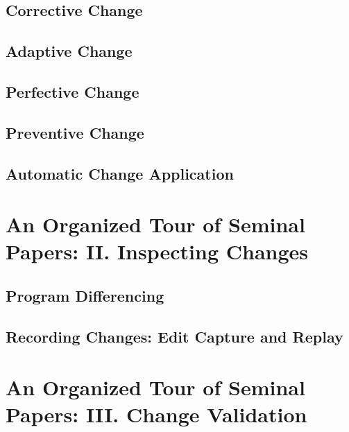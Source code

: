 \documentclass[runningheads,a4paper]{llncs}
\begin{document}
\subsection{Corrective Change}
\label{sec:corrective}
 

\subsection{Adaptive Change}
\label{sec:adaptive}
 

\subsection{Perfective Change}
\label{sec:perfective}
 

\subsection{Preventive Change}
\label{sec:preventive}
 

\subsection{Automatic Change Application}
\label{sec:automatic}
 

% 

\section{An Organized Tour of Seminal Papers: II. Inspecting Changes}
 

\subsection{Program Differencing} 
\label{sec:differencing} 
 

\subsection{Recording Changes: Edit Capture and Replay} 
\label{sec:record} 
 

\section{An Organized Tour of Seminal Papers: III. Change Validation} 
\label{sec:debugtest}
 
\end{document}
